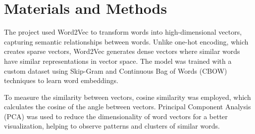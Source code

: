 \section{Materials and Methods}
The project used Word2Vec to transform words into high-dimensional vectors, capturing semantic relationships between words. Unlike one-hot encoding, which creates sparse vectors, Word2Vec generates dense vectors where similar words have similar representations in vector space. The model was trained with a custom dataset using Skip-Gram and Continuous Bag of Words (CBOW) techniques to learn word embeddings.

To measure the similarity between vectors, cosine similarity was employed, which calculates the cosine of the angle between vectors. Principal Component Analysis (PCA) was used to reduce the dimensionality of word vectors for a better visualization, helping to observe patterns and clusters of similar words.


